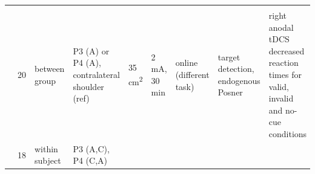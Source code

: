 \documentclass[11pt,]{memoir}
\begin{document}
\begin{longtable}[]{@{}lllllllll@{}}
\begin{minipage}[t]{0.11\columnwidth}
\strut
\end{minipage} & \begin{minipage}[t]{0.24\columnwidth}\raggedright
\strut
\end{minipage}\tabularnewline
\begin{minipage}[t]{0.12\columnwidth}\raggedright
\textcite{Bolognini2010}\strut
\end{minipage} & \begin{minipage}[t]{0.02\columnwidth}\raggedright
20\strut
\end{minipage} & \begin{minipage}[t]{0.04\columnwidth}\raggedright
between
group\strut
\end{minipage} & \begin{minipage}[t]{0.11\columnwidth}\raggedright
P3 (A) or P4 (A),
contralateral shoulder
(ref)\strut
\end{minipage} & \begin{minipage}[t]{0.03\columnwidth}\raggedright
35
cm\textsuperscript{2}\strut
\end{minipage} & \begin{minipage}[t]{0.05\columnwidth}\raggedright
2 mA, 30
min\strut
\end{minipage} & \begin{minipage}[t]{0.05\columnwidth}\raggedright
online
(different
task)\strut
\end{minipage} & \begin{minipage}[t]{0.11\columnwidth}\raggedright
target detection,
endogenous Posner\strut
\end{minipage} & \begin{minipage}[t]{0.24\columnwidth}\raggedright
right anodal tDCS decreased reaction times for valid,
invalid and no-cue conditions\strut
\end{minipage}\tabularnewline
\begin{minipage}[t]{0.12\columnwidth}\raggedright
\textcite{Li2015a}\strut
\end{minipage} & \begin{minipage}[t]{0.02\columnwidth}\raggedright
18\strut
\end{minipage} & \begin{minipage}[t]{0.04\columnwidth}\raggedright
within
subject\strut
\end{minipage} & \begin{minipage}[t]{0.11\columnwidth}\raggedright
P3 (A,C), P4 (C,A)\strut
\end{minipage} & \begin{minipage}[t]{0.03\columnwidth}\raggedright

\end{minipage}
\end{longtable}
\end{document}
